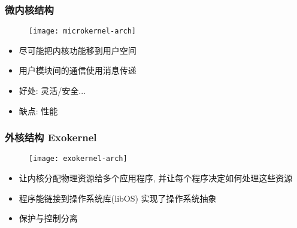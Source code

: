 \begin{frame}[plain]
	
	\frametitle{微内核结构}
	
	\begin{figure}
		\centering
		\texttt{[image: microkernel-arch]}
	\end{figure}
	\pause
	
	\begin{itemize}
		\item 尽可能把内核功能移到用户空间
		\item 用户模块间的通信使用消息传递 %
		\item 好处: 灵活/安全...
		\item 缺点: 性能
	\end{itemize}

\end{frame}

\begin{frame}
	
	\frametitle{外核结构 Exokernel}
	
	\begin{figure}
		\centering
		\texttt{[image: exokernel-arch]}
	\end{figure}

	\begin{itemize}
		\item 让内核分配物理资源给多个应用程序, 并让每个程序决定如何处理这些资源
		\item 程序能链接到操作系统库(libOS) 实现了操作系统抽象
		\item 保护与控制分离
	\end{itemize}
	
\end{frame}

